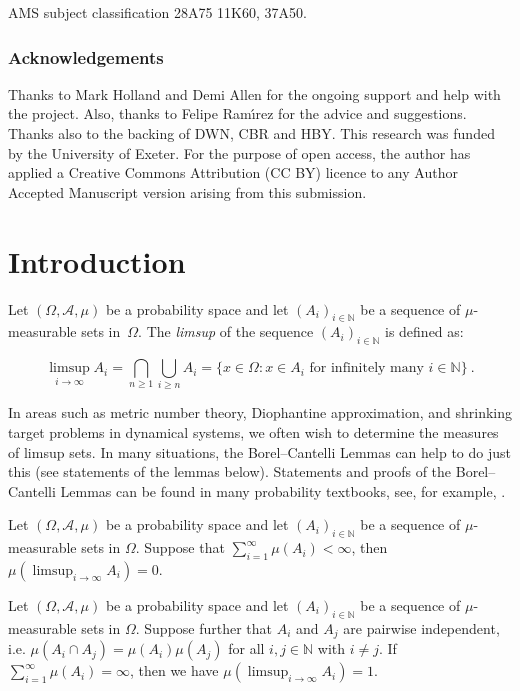 \documentclass[12pt]{article}
\begin{document}
AMS subject classification
28A75 
11K60,
37A50.

\subsubsection*{Acknowledgements} 
Thanks to Mark Holland and Demi Allen for the ongoing support and help with the project. Also, thanks to Felipe Ram\'{\i}rez for the advice and suggestions. Thanks also to the backing of DWN, CBR and HBY. This research was funded by the University of Exeter. For the purpose of open access, the author has applied a Creative Commons Attribution (CC BY) licence to any Author Accepted Manuscript version arising from this submission.

\section{Introduction}
Let $(\Omega, \mathscr{A}, \mu)$ be a probability space and let $(A_i)_{i \in \mathbb{N}}$ be a sequence of $\mu$-measurable sets in~$\Omega$.  The \textit{limsup} of the sequence $(A_i)_{i \in \mathbb{N}}$ is defined as:

\[ \limsup_{i \rightarrow \infty} A_i= \bigcap_{n \geq 1}\bigcup_{i \geq n} A_i= \{x \in \Omega : x \in A_i \text{ for infinitely many } i \in \mathbb{N} \}  ~.\]

In areas such as metric number theory, Diophantine approximation, and shrinking target problems in dynamical systems, we often wish to determine the measures of limsup sets. In many situations, the Borel--Cantelli Lemmas can help to do just this (see statements of the lemmas below). Statements and proofs of the Borel--Cantelli Lemmas can be found in many probability textbooks, see, for example, \cite{billingsley1995probability}. 

\begin{theoremBCC*}\label{BCconv}
Let $(\Omega, \mathscr{A}, \mu)$ be a probability space and let $(A_i)_{i \in \mathbb{N}}$ be a sequence of $\mu$-measurable sets in $\Omega$. Suppose that $\sum_{i=1}^{\infty} \mu(A_i)<\infty$, then $\mu(\limsup_{i \rightarrow \infty} A_i)=0$.
\end{theoremBCC*}

\begin{theoremBCD*}\label{BCdiv}
Let $(\Omega, \mathscr{A}, \mu)$ be a probability space and let $(A_i)_{i \in \mathbb{N}}$ be a sequence of $\mu$-measurable sets in $\Omega$. Suppose further that $A_i$ and $A_j$ are pairwise independent, i.e. $\mu(A_i \cap A_j)=\mu(A_i)\mu(A_j)$ for all $i,j \in \mathbb{N}$ with $i \neq j$. If $\sum_{i=1}^{\infty} \mu(A_i)=\infty$, then we have $\mu(\limsup_{i \rightarrow \infty} A_i)=1$.
\end{theoremBCD*}
\end{document}
